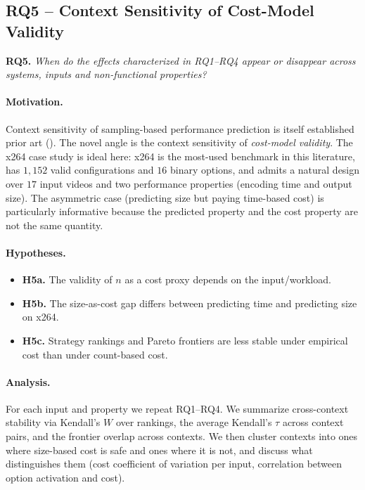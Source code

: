 \subsection{RQ5 -- Context Sensitivity of Cost-Model Validity}
\label{subsec:rq5}

\textbf{RQ5.} \emph{When do the effects characterized in RQ1--RQ4 appear or
disappear across systems, inputs and non-functional properties?}

\paragraph*{Motivation.}
Context sensitivity of sampling-based performance prediction is itself
established prior art (). The novel angle is
the context sensitivity of \emph{cost-model validity}. The x264 case study is
ideal here: x264 is the most-used benchmark in this literature, has $1{,}152$
valid configurations and $16$ binary options, and admits a natural design over
$17$ input videos and two performance properties (encoding time and output
size). The asymmetric case (predicting size but paying time-based cost) is
particularly informative because the predicted property and the cost property
are not the same quantity.

\paragraph*{Hypotheses.}
\begin{itemize}
    \item \textbf{H5a.} The validity of $n$ as a cost proxy depends on the
    input/workload.
    \item \textbf{H5b.} The size-as-cost gap differs between predicting time
    and predicting size on x264.
    \item \textbf{H5c.} Strategy rankings and Pareto frontiers are less stable
    under empirical cost than under count-based cost.
\end{itemize}

\paragraph*{Analysis.}
For each input and property we repeat RQ1--RQ4. We summarize cross-context
stability via Kendall's $W$ over rankings, the average Kendall's $\tau$ across
context pairs, and the frontier overlap across contexts. We then cluster
contexts into ones where size-based cost is safe and ones where it is not, and
discuss what distinguishes them (\eg cost coefficient of variation per input,
correlation between option activation and cost).

